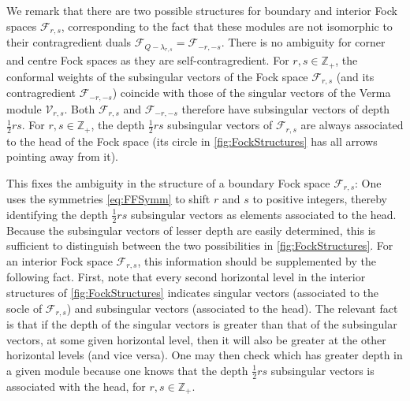 \documentclass[a4paper,reqno,12pt]{report}
\theoremstyle{definition}
\numberwithin{equation}{section}
\newcommand{\ZZ}{\mathbb{Z}}
\newcommand{\Ver}[1]{\mathcal{V}_{#1}}       %
\newcommand{\Fock}[1]{\mathcal{F}_{#1}}      %
\newcommand{\svs}{singular vectors}
\newcommand{\ssvs}{subsingular vectors}
\theoremstyle{plain}
\begin{document}
We remark that there are two possible structures for boundary and interior Fock spaces $\Fock{r,s}$, corresponding to the fact that these modules are not isomorphic to their contragredient duals $\Fock{Q-\lambda_{r,s}} = \Fock{-r,-s}$.  There is no ambiguity for corner and centre Fock spaces as they are self-contragredient.  For $r,s \in \ZZ_+$, the conformal weights of the \ssvs{} of the Fock space $\Fock{r,s}$ (and its contragredient $\Fock{-r,-s}$) coincide with those of the \svs{} of the Verma module $\Ver{r,s}$.  Both $\Fock{r,s}$ and $\Fock{-r,-s}$ therefore have \ssvs{} of depth $\frac{1}{2} rs$.  For $r,s \in \ZZ_+$, the depth $\frac{1}{2} rs$ \ssvs{} of $\Fock{r,s}$ are always associated to the head of the Fock space (its circle in \cref{fig:FockStructures} has all arrows pointing away from it).

This fixes the ambiguity in the structure of a boundary Fock space $\Fock{r,s}$:  One uses the symmetries \eqref{eq:FFSymm} to shift $r$ and $s$ to positive integers, thereby identifying the depth $\frac{1}{2} rs$ \ssvs{} as elements associated to the head.  Because the \ssvs{} of lesser depth are easily determined, this is sufficient to distinguish between the two possibilities in \cref{fig:FockStructures}.  For an interior Fock space $\Fock{r,s}$, this information should be supplemented by the following fact.  First, note that every second horizontal level in the interior structures of \cref{fig:FockStructures} indicates \svs{} (associated to the socle of $\Fock{r,s}$) and \ssvs{} (associated to the head).  The relevant fact is that if the depth of the \svs{} is greater than that of the \ssvs{}, at some given horizontal level, then it will also be greater at the other horizontal levels (and vice versa).  One may then check which has greater depth in a given module because one knows that the depth $\frac{1}{2} rs$ \ssvs{} is associated with the head, for $r,s \in \ZZ_+$.
\end{document}
